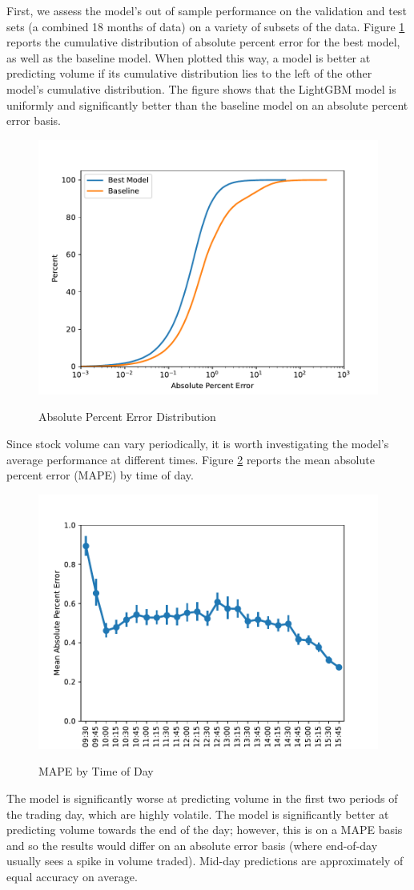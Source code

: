 \documentclass[12pt]{article}
\begin{document}
First, we assess the model's out of sample performance on the validation and test sets (a combined 18 months of data) on a variety of subsets of the data. Figure \ref{fig:absolute_percent_error_distribution} reports the cumulative distribution of absolute percent error for the best model, as well as the baseline model. When plotted this way, a model is better at predicting volume if its cumulative distribution lies to the left of the other model's cumulative distribution. The figure shows that the LightGBM model is uniformly and significantly better than the baseline model on an absolute percent error basis.

\begin{figure}[H]
    \centering
    \caption{Absolute Percent Error Distribution}
    \includegraphics[width=0.75\linewidth]{../Output/absolute_percent_error_distribution.pdf}
    \label{fig:absolute_percent_error_distribution}
\end{figure}

Since stock volume can vary periodically, it is worth investigating the model's average performance at different times. Figure \ref{fig:mape_by_time} reports the mean absolute percent error (MAPE) by time of day.
\begin{figure}[H]
    \centering
    \caption{MAPE by Time of Day}
    \includegraphics[width=0.75\linewidth]{../Output/mape_by_time.pdf}
    \label{fig:mape_by_time}
\end{figure}
The model is significantly worse at predicting volume in the first two periods of the trading day, which are highly volatile. The model is significantly better at predicting volume towards the end of the day; however, this is on a MAPE basis and so the results would differ on an absolute error basis (where end-of-day usually sees a spike in volume traded). Mid-day predictions are approximately of equal accuracy on average.
\end{document}
